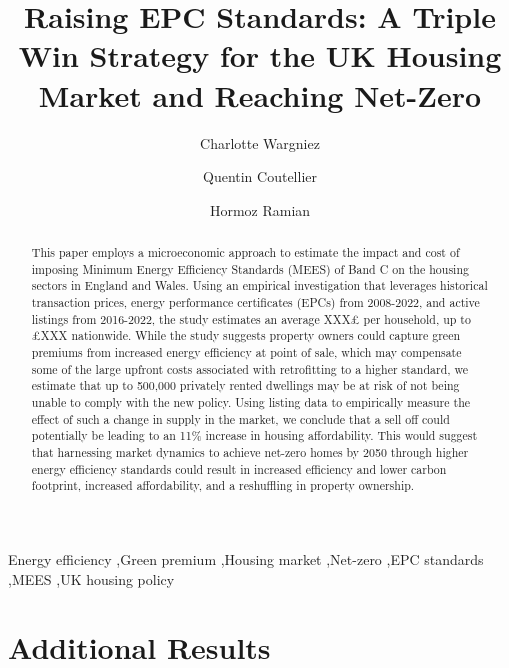 \documentclass[final, 1p, times]{elsarticle}
\begin{document}
\begin{frontmatter}

\title{Raising EPC Standards: A Triple Win Strategy for the UK Housing Market and Reaching Net-Zero}

\author[oxford]{Charlotte Wargniez}
\author[oxford]{Quentin Coutellier}
\author[glasgow]{Hormoz Ramian}




\begin{abstract}
This paper employs a microeconomic approach to estimate the impact and cost of imposing Minimum Energy Efficiency Standards (MEES) of Band C on the housing sectors in England and Wales. Using an empirical investigation that leverages historical transaction prices, energy performance certificates (EPCs) from 2008-2022, and active listings from 2016-2022, the study estimates an average XXX£ per household, up to £XXX nationwide. While the study suggests property owners could capture green premiums from increased energy efficiency at point of sale, which may compensate some of the large upfront costs associated with retrofitting to a higher standard, we estimate that up to 500,000 privately rented dwellings may be at risk of not being unable to comply with the new policy. Using listing data to empirically measure the effect of such a change in supply in the market, we conclude that a sell off could potentially be leading to an 11\% increase in housing affordability. This would suggest that harnessing market dynamics to achieve net-zero homes by 2050 through higher energy efficiency standards could result in increased efficiency and lower carbon footprint, increased affordability, and a reshuffling in property ownership.
\end{abstract}

\begin{keyword}
Energy efficiency \sep Green premium \sep Housing market \sep Net-zero \sep EPC standards \sep MEES \sep UK housing policy
\end{keyword}

\end{frontmatter}







\appendix
\section{Additional Results}
\label{appendix:results}




\end{document}

